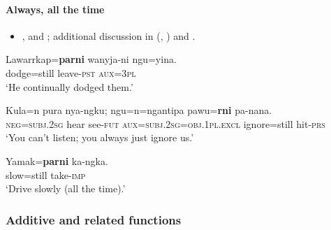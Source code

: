 \paragraph{Always, all the time}
\label{appendixGurindjiAlways}
\begin{itemize}
	\sloppy
	\item \textcite{McConvell1983}, \textcite[594–595]{MeakinsMcConvell2021} and \textcite[s.v. \textit{rni}]{MeakinsEtAl2013}; additional discussion in \citeauthor{vanBaar1991} (\citeyear{vanBaar1991}, \citeyear[112–113]{vanBaar1997}) and \textcite{SchultzeBerndt2002}.
\end{itemize}
\begin{exe}
	
	\ex 
	\gll Lawarrkap=\textbf{parni} wanyja-ni ngu=yina.\\
	dodge=still leave-\textsc{pst} \textsc{aux}=3\textsc{pl}\\
	\glt \lq He continually dodged them.' \parencite[594]{MeakinsMcConvell2021}
	
	\ex 
	\gll Kula=n pura nya-ngku; ngu=n=ngantipa pawu=\textbf{rni} pa-nana.\\
	\textsc{neg}=\textsc{subj}.2\textsc{sg} hear see-\textsc{fut} \textsc{aux}=\textsc{subj}.\textsc{2sg}=\textsc{obj}.1\textsc{pl}.\textsc{excl} ignore=still hit-\textsc{prs}\\
	\glt \lq You can’t listen; you always just ignore us.' \parencite[20]{McConvell1983}
	
	\ex 
	\gll Yamak=\textbf{parni} ka-ngka.\\
	slow=still take-\textsc{imp}\\
	\glt \lq Drive slowly (all the time).' \parencite[21]{McConvell1983}
\end{exe}


\subsubsection{Additive and related functions}
